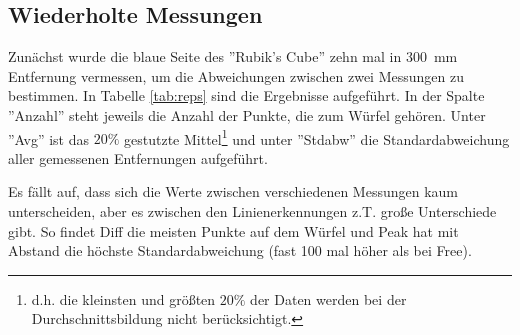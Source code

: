 \documentclass[ngerman,a4paper,parskip=half]{scrartcl}
\begin{document}
\subsection{Wiederholte Messungen}
\label{sec:reps}

Zunächst wurde die blaue Seite des ''Rubik's Cube'' zehn mal in 300~mm Entfernung vermessen, um die Abweichungen zwischen zwei Messungen zu bestimmen. In Tabelle \ref{tab:reps} sind die Ergebnisse aufgeführt. In der Spalte ''Anzahl'' steht jeweils die Anzahl der Punkte, die zum Würfel gehören. Unter ''Avg'' ist das $20 \%$ gestutzte Mittel\footnote{d.h. die kleinsten und größten $20 \%$ der Daten werden bei der Durchschnittsbildung nicht berücksichtigt.} und unter ''Stdabw'' die Standardabweichung aller gemessenen Entfernungen aufgeführt.

Es fällt auf, dass sich die Werte zwischen verschiedenen Messungen kaum unterscheiden, aber es zwischen den Linienerkennungen z.T. große Unterschiede gibt. So findet Diff die meisten Punkte auf dem Würfel und Peak hat mit Abstand die höchste Standardabweichung (fast 100 mal höher als bei Free).
\end{document}
